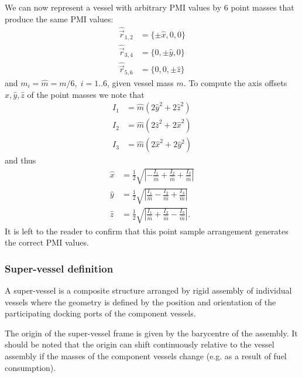 \documentclass[Orbiter Technical Reference.tex]{subfiles}
\begin{document}
We can now represent a vessel with arbitrary PMI values by 6 point masses that produce the same PMI values:
\begin{equation}
\begin{split}
  \hat{\vec{r}}_{1,2} &= \lbrace \pm \hat x, 0, 0 \rbrace \\
  \hat{\vec{r}}_{3,4} &= \lbrace 0, \pm \hat y, 0 \rbrace \\
  \hat{\vec{r}}_{5,6} &= \lbrace 0, 0, \pm \hat z \rbrace
\end{split}
\end{equation}
and $m_i = \hat m = m/6,\; i=1..6$, given vessel mass $m$.
To compute the axis offsets $\hat x, \hat y, \hat z$ of the point masses we note that
\begin{equation}
\begin{split}
  I_1 &= \hat m (2 \hat y^2 + 2 \hat z^2) \\
  I_2 &= \hat m (2 \hat z^2 + 2 \hat x^2) \\
  I_3 &= \hat m (2 \hat x^2 + 2 \hat y^2)
\end{split}
\end{equation}
and thus
\begin{equation}\label{eq:smp_ofs}
\begin{split}
\hat x &= \frac{1}{2} \sqrt{\left| -\frac{I_1}{\hat m} + \frac{I_2}{\hat m} + \frac{I_3}{\hat m} \right|} \\
\hat y &= \frac{1}{2} \sqrt{\left| \frac{I_1}{\hat m} - \frac{I_2}{\hat m} + \frac{I_3}{\hat m} \right|} \\
\hat z &= \frac{1}{2} \sqrt{\left| \frac{I_1}{\hat m} + \frac{I_2}{\hat m} - \frac{I_3}{\hat m} \right|}.
\end{split}
\end{equation}
It is left to the reader to confirm that this point sample arrangement generates the correct PMI values.

\subsubsection{Super-vessel definition}
A super-vessel is a composite structure arranged by rigid assembly of individual vessels where the geometry is defined by the position and orientation of the participating docking ports of the component vessels.

The origin of the super-vessel frame is given by the barycentre of the assembly. It should be noted that the origin can shift continuously relative to the vessel assembly if the masses of the component vessels change (e.g. as a result of fuel consumption).
\end{document}
